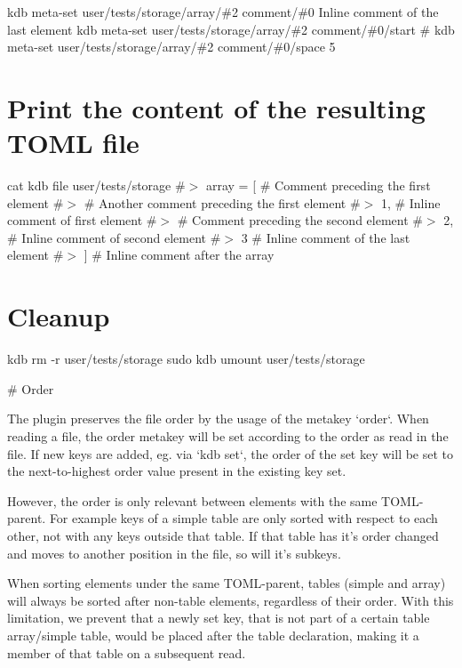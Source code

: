 kdb meta-\/set \textquotesingle{}user/tests/storage/array/\#2\textquotesingle{} \textquotesingle{}comment/\#0\textquotesingle{} \textquotesingle{} Inline comment of the last element\textquotesingle{} kdb meta-\/set \textquotesingle{}user/tests/storage/array/\#2\textquotesingle{} \textquotesingle{}comment/\#0/start\textquotesingle{} \textquotesingle{}\#\textquotesingle{} kdb meta-\/set \textquotesingle{}user/tests/storage/array/\#2\textquotesingle{} \textquotesingle{}comment/\#0/space\textquotesingle{} \textquotesingle{}5\textquotesingle{}\hypertarget{autotoc_md693_autotoc_md789}{}\section{Print the content of the resulting T\+O\+M\+L file}\label{autotoc_md693_autotoc_md789}
cat {\ttfamily kdb file user/tests/storage} \#$>$ array = \mbox{[} \# Comment preceding the first element \#$>$ \# Another comment preceding the first element \#$>$ 1, \# Inline comment of first element \#$>$ \# Comment preceding the second element \#$>$ 2, \# Inline comment of second element \#$>$ 3 \# Inline comment of the last element \#$>$ \mbox{]} \# Inline comment after the array\hypertarget{autotoc_md693_autotoc_md790}{}\section{Cleanup}\label{autotoc_md693_autotoc_md790}
kdb rm -\/r user/tests/storage sudo kdb umount user/tests/storage 
\begin{DoxyCode}
# Order

The plugin preserves the file order by the usage of the metakey `order`. When reading a file, the order
       metakey will be set according to the order as read in the file.
If new keys are added, eg. via `kdb set`, the order of the set key will be set to the next-to-highest order
       value present in the existing key set.

However, the order is only relevant between elements with the same TOML-parent. For example keys of a
       simple table are only sorted with respect to each other, not with any keys outside that table. If that table has
       it's order changed and moves to another position in the file, so will it's subkeys.

When sorting elements under the same TOML-parent, tables (simple and array) will always be sorted after
       non-table elements, regardless of their order.
With this limitation, we prevent that a newly set key, that is not part of a certain table array/simple
       table, would be placed after the table declaration, making it a member of that table on a subsequent read.
\end{DoxyCode}
